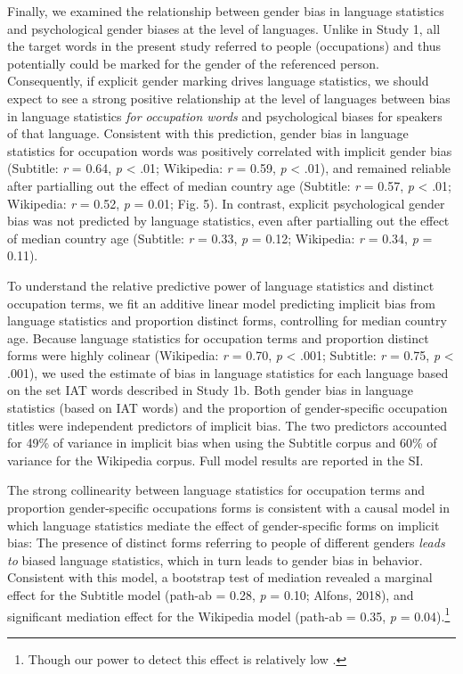 \documentclass[9pt,twocolumn,twoside]{pnas-new}
\begin{document}
Finally, we examined the relationship between gender bias in language
statistics and psychological gender biases at the level of languages.
Unlike in Study 1, all the target words in the present study referred to
people (occupations) and thus potentially could be marked for the gender
of the referenced person. Consequently, if explicit gender marking
drives language statistics, we should expect to see a strong positive
relationship at the level of languages between bias in language
statistics \emph{for occupation words} and psychological biases for
speakers of that language. Consistent with this prediction, gender bias
in language statistics for occupation words was positively correlated
with implicit gender bias (Subtitle: \emph{r} = 0.64, \emph{p}
\textless{} .01; Wikipedia: \emph{r} = 0.59, \emph{p} \textless{} .01),
and remained reliable after partialling out the effect of median country
age (Subtitle: \emph{r} = 0.57, \emph{p} \textless{} .01; Wikipedia:
\emph{r} = 0.52, \emph{p} = 0.01; Fig. 5). In contrast,  explicit psychological gender bias was not predicted by language statistics, even after partialling out the effect of median country age (Subtitle: \emph{r} = 0.33, \emph{p} = 0.12;
Wikipedia: \emph{r} = 0.34, \emph{p} = 0.11).

To understand the relative predictive power of language statistics and
distinct occupation terms, we fit an additive linear model predicting implicit bias
from language statistics and proportion distinct forms, controlling for
median country age. Because language statistics for occupation terms and
proportion distinct forms were highly colinear (Wikipedia: \emph{r} =
0.70, \emph{p} \textless{} .001; Subtitle: \emph{r} = 0.75, \emph{p}
\textless{} .001), we used the estimate of bias in language statistics
for each language based on the set IAT words described in Study 1b. Both
gender bias in language statistics (based on IAT words) and the
proportion of gender-specific occupation titles were independent
predictors of implicit bias. The two predictors accounted for 49\% of
variance in implicit bias when using the Subtitle corpus and 60\% of
variance for the Wikipedia corpus. Full model results are reported in
the SI.

The strong collinearity between language statistics for
occupation terms and proportion gender-specific occupations forms is
consistent with a causal model in which language statistics mediate the
effect of gender-specific forms on implicit bias: The presence of
distinct forms referring to people of different genders \emph{leads to}
biased language statistics, which in turn leads to gender bias in
behavior. Consistent with this model, a bootstrap test of mediation
revealed a marginal effect for the Subtitle model (path-ab = 0.28,
\emph{p} = 0.10; Alfons, 2018), and significant mediation effect for the
Wikipedia model (path-ab = 0.35, \emph{p} =
0.04).\footnote{Though our power to detect this effect is relatively low \cite[approximately, .4]{schoemann2017determining}.}
\end{document}
